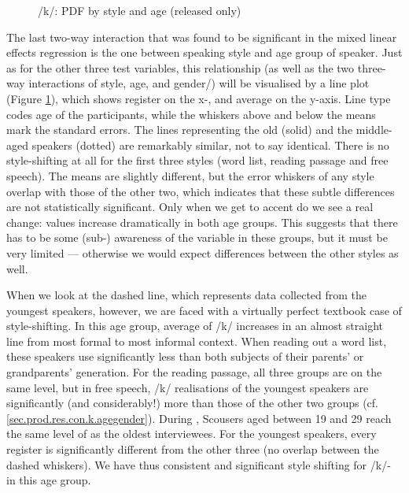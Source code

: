 \begin{figure}[h]
	\centering
		\resizebox{0.5\linewidth}{!}{} 
	\caption{/k/: PDF by style and age (released only)}
	\label{fig.line.k.tot}
\end{figure}

The last two-way interaction that was found to be significant in the mixed linear effects regression is the one between speaking style and age group of speaker.
Just as for the other three test variables, this relationship (as well as the two three-way interactions of style, age, and gender/) will be visualised by a line plot (Figure \ref{fig.line.k.tot}), which shows register on the x-, and average  on the y-axis.
Line type codes age of the participants, while the whiskers above and below the means mark the standard errors.
The lines representing the old (solid) and the middle-aged speakers (dotted) are remarkably similar, not to say identical.
There is no style-shifting at all for the first three styles (word list, reading passage and free speech).
The means are slightly different, but the error whiskers of any style overlap with those of the other two, which indicates that these subtle differences are not statistically significant.
Only when we get to accent  do we see a real change:  values increase dramatically in both age groups.
This suggests that there has to be some (sub-) awareness of the variable in these groups, but it must be very limited --- otherwise we would expect differences between the other styles as well.

When we look at the dashed line, which represents data collected from the youngest speakers, however, we are faced with a virtually perfect textbook case of  style-shifting.
In this age group, average  of /k/ increases in an almost straight line from most formal to most informal context.
When reading out a word list, these speakers use significantly less  than both subjects of their parents' or grandparents' generation.
For the reading passage, all three groups are on the same level, but in free speech, /k/ realisations of the youngest speakers are significantly (and considerably!) more  than those of the other two groups (cf. \ref{sec.prod.res.con.k.agegender}).
During , Scousers aged between 19 and 29 reach the same level of  as the oldest interviewees.
For the youngest speakers, every register is significantly different from the other three (no overlap between the dashed whiskers).
We have thus consistent and significant style shifting for /k/- in this age group.

